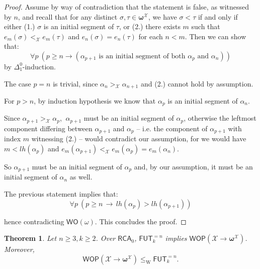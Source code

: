 \documentclass{amsart}
\newcommand\RCA{\mathsf{RCA}}
\newcommand\FUT{\mathsf{FUT}}
\newcommand\WO{\mathsf{WO}}
\newcommand\WOP{\mathsf{WOP}}
\newcommand\W{\mathrm{W}}
\newcommand{\LoX}{\mathcal{X}}
\newcommand\boldomega{\pmb{\omega}}
\newtheorem{theorem}{Theorem}
\begin{document}
\begin{proof}

Assume by way of contradiction that the statement is false, as witnessed by $n$, and recall that for any distinct $\sigma, \tau \in \boldomega^\LoX$, we have $\sigma < \tau$ if and only if either (1.) $\sigma$ is an initial segment of $\tau$, or (2.) there exists $m$ such that $e_m(\sigma) <_\LoX e_m(\tau)$ and  $e_n(\sigma) = e_n(\tau)$ for each $n<m$. Then we can show that:
$$
\forall p\ (p \geq n \rightarrow (\alpha_{p+1} \text{ is an initial segment of both } \alpha_p \text{ and } \alpha_n))
$$
by $\Delta^0_1$-induction.

The case $p=n$ is trivial, since $\alpha_n >_{\LoX} \alpha_{n+1}$ and (2.) cannot hold by assumption.

For $p>n$, by induction hypothesis we know that $\alpha_p$ is an initial segment of $\alpha_n$. 

Since $\alpha_{p+1} >_{\LoX} \alpha_p$, $\ \alpha_{p+1}$ must be an initial segment of $\alpha_p$, otherwise the leftmost component differing between $\alpha_{p+1}$ and $\alpha_p$ -- i.e. the component of $\alpha_{p+1}$ with index $m$ witnessing (2.) -- would contradict our assumption, for we would have $m < lh(\alpha_p)$ and $e_m(\alpha_{p+1}) <_\LoX e_m(\alpha_p) = e_m(\alpha_n)$.

So  $\alpha_{p+1}$ must be an initial segment of $\alpha_p$ and, by our assumption, it must be an initial segment of $\alpha_n$ as well.

The previous statement implies that:
$$
\forall p\ (p \geq n \,\rightarrow\, lh(\alpha_p) > lh(\alpha_{p+1}))
$$

hence contradicting $\WO(\omega)$. This concludes the proof.
\end{proof}

\begin{theorem}\label{prop:RTomega}
Let $n \geq 3, k \geq 2$. Over $\RCA_0$, $\FUT^{=n}_k$ implies $\WOP(\mathcal{X} \to \boldomega^\mathcal{X})$. Moreover, 
$$\WOP(\mathcal{X} \to \boldomega^\LoX) \leq_\W \FUT^{=n}_k.$$
\end{theorem}
\end{document}

